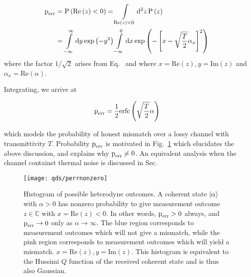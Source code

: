 \begin{align}
\text{p}_{\text{err}} &= \text{P}\left(\text{Re}\left(z\right)<0\right) = \int\limits_{\text{Re}\left(z\right)<0}\mathop{}\!\mathrm{d^2} z \, \text{P}\left(z\right) \notag \\
&= \int\limits_{-\infty}^{\infty} \mathrm{d} y \, \text{exp}\left(-y^2\right) \int\limits_{-\infty}^{0} \mathrm{d} x \, \text{exp}\left(-\left[x - \sqrt{\frac{T}{2}}\alpha_x\right]^2\right)
\end{align}
where the factor $1/\sqrt{2}$ arises from Eq.~ %
and where $x = \text{Re}\left(z\right), y = \text{Im}\left(z\right)$ and $\alpha_x = \text{Re}\left(\alpha\right)$. 

Integrating, we arrive at

\begin{equation}\label{eqn:perr}
\text{p}_{\text{err}} = \frac{1}{2}\text{erfc}\left(\sqrt{\frac{T}{2}}\alpha\right)
\end{equation}

\noindent which models the probability of honest mismatch over a lossy channel with transmittivity $T$. Probability $\text{p}_{\text{err}}$ is motivated in Fig.~\ref{fig:perr} which elucidates the above discussion, and explains why $\text{p}_{\text{err}} \ne 0$. An equivalent analysis when the channel containst thermal noise is discussed in Sec.~

\begin{figure}[htp]
\centering
\texttt{[image: qds/perrnonzero]}
\caption{\label{fig:perr} Histogram of possible heterodyne outcomes. A coherent state $\ket{\alpha}$ with $\alpha>0$ has nonzero probability to give measurement outcome $z \in \mathbb{C}$ with $x = \text{Re}\left(z\right) < 0$. In other words, $\text{p}_{\text{err}} > 0$ always, and $\text{p}_{\text{err}} \rightarrow 0$ only as $\alpha \rightarrow \infty$. The blue region corresponds to measurement outcomes which will not give a mismatch, while the pink region corresponds to measurement outcomes which will yield a mismatch. $x = \text{Re}\left(z\right), y = \text{Im}\left(z\right)$. This histogram is equivalent to the Hussimi $Q$ function \cite{Leonhardt2010} of the received coherent state and is thus also Gaussian.}
\end{figure}


